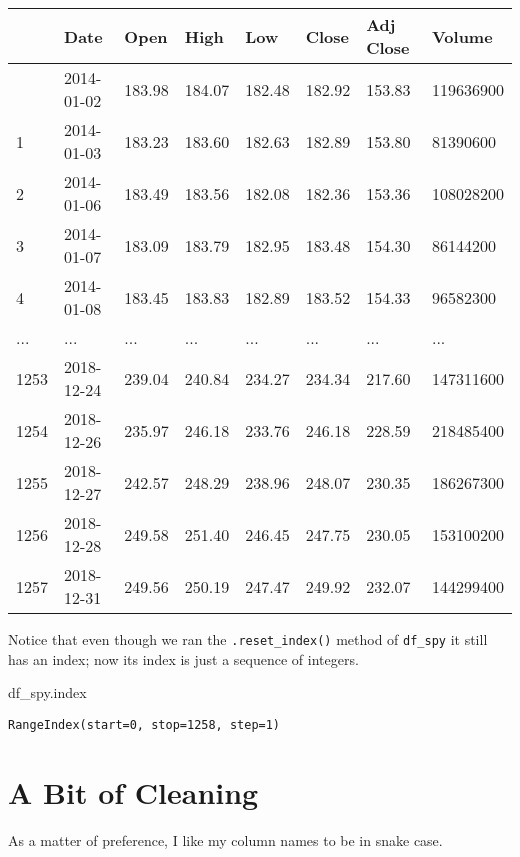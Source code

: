 \documentclass[
  letterpaper,
  DIV=11,
  numbers=noendperiod]{scrreprt}
\newenvironment{Shaded}{\begin{snugshade}}{\end{snugshade}}
\newcommand{\NormalTok}[1]{\textcolor[rgb]{0.00,0.23,0.31}{#1}}
\begin{document}
\begin{longtable}[]{@{}llllllll@{}}
\toprule\noalign{}
& Date & Open & High & Low & Close & Adj Close & Volume \\
\midrule\noalign{}
\endhead
\bottomrule\noalign{}
\endlastfoot
0 & 2014-01-02 & 183.98 & 184.07 & 182.48 & 182.92 & 153.83 &
119636900 \\
1 & 2014-01-03 & 183.23 & 183.60 & 182.63 & 182.89 & 153.80 &
81390600 \\
2 & 2014-01-06 & 183.49 & 183.56 & 182.08 & 182.36 & 153.36 &
108028200 \\
3 & 2014-01-07 & 183.09 & 183.79 & 182.95 & 183.48 & 154.30 &
86144200 \\
4 & 2014-01-08 & 183.45 & 183.83 & 182.89 & 183.52 & 154.33 &
96582300 \\
... & ... & ... & ... & ... & ... & ... & ... \\
1253 & 2018-12-24 & 239.04 & 240.84 & 234.27 & 234.34 & 217.60 &
147311600 \\
1254 & 2018-12-26 & 235.97 & 246.18 & 233.76 & 246.18 & 228.59 &
218485400 \\
1255 & 2018-12-27 & 242.57 & 248.29 & 238.96 & 248.07 & 230.35 &
186267300 \\
1256 & 2018-12-28 & 249.58 & 251.40 & 246.45 & 247.75 & 230.05 &
153100200 \\
1257 & 2018-12-31 & 249.56 & 250.19 & 247.47 & 249.92 & 232.07 &
144299400 \\
\end{longtable}

Notice that even though we ran the \texttt{.reset\_index()} method of
\texttt{df\_spy} it still has an index; now its index is just a sequence
of integers.

\begin{Shaded}
\begin{Highlighting}[]
\NormalTok{df\_spy.index}
\end{Highlighting}
\end{Shaded}

\begin{verbatim}
RangeIndex(start=0, stop=1258, step=1)
\end{verbatim}

\hypertarget{a-bit-of-cleaning}{%
\section{A Bit of Cleaning}\label{a-bit-of-cleaning}}

As a matter of preference, I like my column names to be in snake case.
\end{document}
